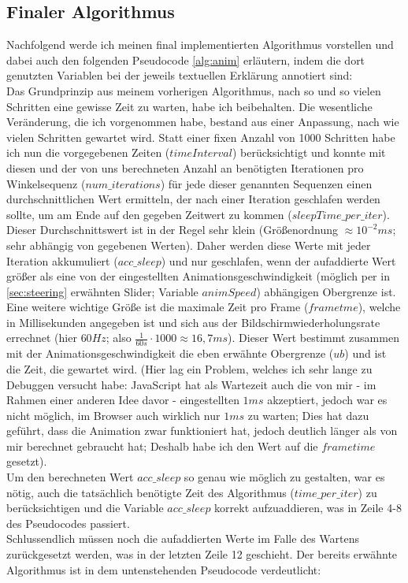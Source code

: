 \subsection{Finaler Algorithmus}
\label{sec:final_anim}
Nachfolgend werde ich meinen final implementierten Algorithmus vorstellen und dabei auch den folgenden Pseudocode \ref{alg:anim} erläutern, indem die dort genutzten Variablen bei der jeweils textuellen Erklärung annotiert sind: \\
Das Grundprinzip aus meinem vorherigen Algorithmus, nach so und so vielen Schritten eine gewisse Zeit zu warten, habe ich beibehalten. Die wesentliche Veränderung, die ich vorgenommen habe, bestand aus einer Anpassung, nach wie vielen Schritten gewartet wird. Statt einer fixen Anzahl von 1000 Schritten habe ich nun die vorgegebenen Zeiten ($timeInterval$) berücksichtigt und konnte mit diesen und der von uns berechneten Anzahl an benötigten Iterationen pro Winkelsequenz ($num\_iterations$) für jede dieser genannten Sequenzen einen durchschnittlichen Wert ermitteln, der nach einer Iteration geschlafen werden sollte, um am Ende auf den gegeben Zeitwert zu kommen ($sleepTime\_per\_iter$). Dieser Durchschnittswert ist in der Regel sehr klein (Größenordnung $\approx 10^{-2}ms$; sehr abhängig von gegebenen Werten). Daher werden diese Werte mit jeder Iteration akkumuliert ($acc\_sleep$) und nur geschlafen, wenn der aufaddierte Wert größer als eine von der eingestellten Animationsgeschwindigkeit (möglich per in \ref{sec:steering} erwähnten Slider; Variable $animSpeed$) abhängigen Obergrenze ist. Eine weitere wichtige Größe ist die maximale Zeit pro Frame ($frametme$), welche in Millisekunden angegeben ist und sich aus der Bildschirmwiederholungsrate errechnet (hier $60Hz$; also $\frac{1}{60s} \cdot 1000 \approx 16,7ms$). Dieser Wert bestimmt zusammen mit der Animationsgeschwindigkeit die eben erwähnte Obergrenze ($ub$) und ist die Zeit, die gewartet wird. (Hier lag ein Problem, welches ich sehr lange zu Debuggen versucht habe: JavaScript hat als Wartezeit auch die von mir - im Rahmen einer anderen Idee davor - eingestellten $1ms$ akzeptiert, jedoch war es nicht möglich, im Browser auch wirklich nur $1ms$ zu warten; Dies hat dazu geführt, dass die Animation zwar funktioniert hat, jedoch deutlich länger als von mir berechnet gebraucht hat; Deshalb habe ich den Wert auf die $frametime$ gesetzt). \\
Um den berechneten Wert $acc\_sleep$ so genau wie möglich zu gestalten, war es nötig, auch die tatsächlich benötigte Zeit des Algorithmus ($time\_per\_iter$) zu berücksichtigen und die Variable $acc\_sleep$ korrekt aufzuaddieren, was in Zeile 4-8 des Pseudocodes passiert. \\
Schlussendlich müssen noch die aufaddierten Werte im Falle des Wartens zurückgesetzt werden, was in der letzten Zeile 12 geschieht. Der bereits erwähnte Algorithmus ist in dem untenstehenden Pseudocode verdeutlicht: \\

